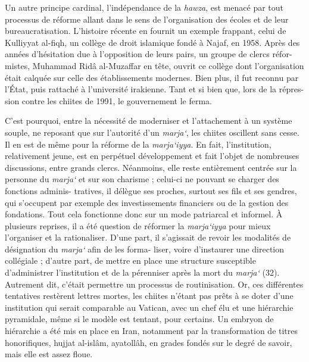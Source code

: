 Un autre principe cardinal, l'indépendance de la \emph{hawza}, est
menacé par tout processus de réforme allant dans le sens de
l'organisation des écoles et de leur bureaucratisation. L'histoire
récente en fournit un exemple frappant, celui de Kulliyyat al-fiqh, un
collège de droit islamique fondé à Najaf, en 1958. Après des années
d'hésitation due à l'opposition de leurs pairs, un groupe de clercs
réfor- mistes, Muhammad Ridâ al-Muzaffar en tête, ouvrit ce collège dont
l'organisation était calquée sur celle des établissements modernes. Bien
plus, il fut reconnu par l'État, puis rattaché à l'université irakienne.
Tant et si bien que, lors de la répres- sion contre les chiites de 1991,
le gouvernement le ferma.

C'est pourquoi, entre la nécessité de moderniser et l'attachement à un
système souple, ne reposant que sur l'autorité d'un \emph{marja`}, les
chiites oscillent sans cesse. Il
en est de même pour la réforme de la \emph{marja`iyya}. En fait,
l'institution, relativement jeune, est en perpétuel développement et
fait l'objet de nombreuses discussions, entre grands clercs. Néanmoins,
elle reste entièrement centrée sur la personne du \emph{marja`} et sur
son charisme ; celui-ci ne pouvant se charger des fonctions adminis-
tratives, il délègue ses proches, surtout ses fils et ses gendres, qui
s'occupent par exemple des investissements financiers ou de la gestion
des fondations. Tout cela fonctionne donc sur un mode patriarcal et
informel. À plusieurs reprises, il a été question de réformer la
\emph{marja`iyya} pour mieux l'organiser et la rationaliser. D'une part,
il s'agissait de revoir les modalités de désignation du \emph{marja`}
afin de les forma- liser, voire d'instaurer une direction collégiale ;
d'autre part, de mettre en place une structure susceptible d'administrer
l'institution et de la pérenniser après la mort du \emph{marja`} (32).
Autrement dit, c'était permettre un processus de routinisation. Or, ces
différentes tentatives restèrent lettres mortes, les chiites n'étant pas
prêts à se doter d'une institution qui serait comparable au Vatican,
avec un chef élu et une hiérarchie pyramidale, même si le modèle est
tentant, pour certains. Un embryon de hiérarchie a été mis en place en
Iran, notamment par la transformation de titres honorifiques, hujjat
al-islâm, ayatollâh, en grades fondés sur le degré de savoir, mais elle
est assez floue.

